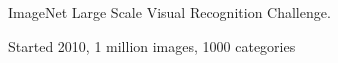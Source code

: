 \documentclass[c,8pt]{beamer}
\begin{document}
\begin{frame}{}{} %

ImageNet Large Scale Visual Recognition
Challenge.


\vspace*{-1em}

\begin{center}

Started 2010, 1 million images, 1000 categories

\vspace*{-2ex}


\end{center}
\end{frame}
\end{document}
